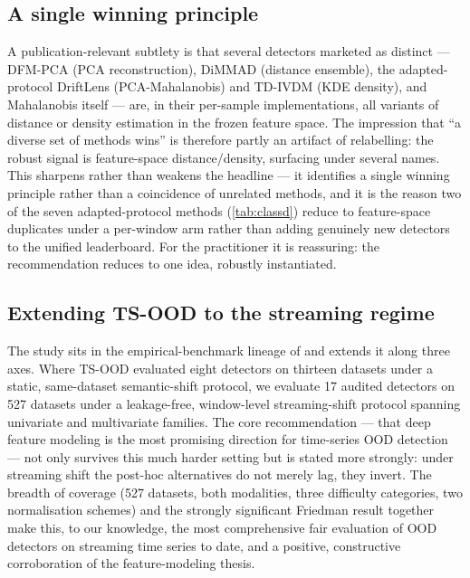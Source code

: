 \subsection{A single winning principle}\label{sec:disc-principle}
A publication-relevant subtlety is that several detectors marketed as distinct ---
DFM-PCA (PCA reconstruction), DiMMAD (distance ensemble), the adapted-protocol DriftLens
(PCA-Mahalanobis) and TD-IVDM (KDE density), and Mahalanobis itself --- are, in
their per-sample implementations, all variants of distance or density estimation in
the frozen feature space. The impression that ``a diverse set of methods wins'' is
therefore partly an artifact of relabelling: the robust signal is feature-space
distance/density, surfacing under several names. This sharpens rather than weakens
the headline --- it identifies a single winning principle rather than a coincidence
of unrelated methods, and it is the reason two of the seven adapted-protocol methods
(\cref{tab:classd}) reduce to feature-space duplicates under a per-window arm rather
than adding genuinely new detectors to the unified leaderboard. For the practitioner
it is reassuring: the recommendation reduces to one
idea, robustly instantiated.

\subsection{Extending TS-OOD to the streaming regime}\label{sec:disc-extension}
The study sits in the empirical-benchmark lineage of \citet{Gungor2025} and extends
it along three axes. Where TS-OOD evaluated eight detectors on thirteen datasets
under a static, same-dataset semantic-shift protocol, we evaluate \num{17} audited
detectors on \num{527} datasets under a leakage-free, window-level streaming-shift
protocol spanning univariate and multivariate families. The core recommendation ---
that deep feature modeling is the most promising direction for time-series OOD
detection --- not only survives this much harder setting but is stated more
strongly: under streaming shift the post-hoc alternatives do not merely lag, they
invert. The breadth of coverage (\num{527} datasets, both modalities, three
difficulty categories, two normalisation schemes) and the strongly significant
Friedman result together make this, to our knowledge, the most comprehensive fair
evaluation of OOD detectors on streaming time series to date, and a positive,
constructive corroboration of the feature-modeling thesis.

